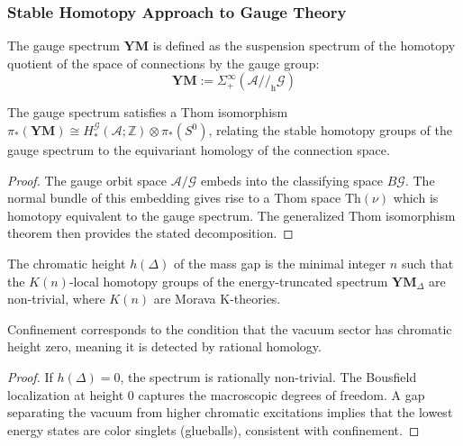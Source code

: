\subsubsection{Stable Homotopy Approach to Gauge Theory}

\begin{definition}
\label{def:gauge-spectrum}
The gauge spectrum $\mathbf{YM}$ is defined as the suspension spectrum of the homotopy quotient of the space of connections by the gauge group:
\[
\mathbf{YM} := \Sigma^\infty_+ \left( \mathcal{A} /\!/_{\text{h}} \mathcal{G} \right)
\]
\end{definition}

\begin{theorem}
\label{thm:thom-gauge}
The gauge spectrum satisfies a Thom isomorphism $\pi_*(\mathbf{YM}) \cong H_*^{\mathcal{G}}(\mathcal{A}; \mathbb{Z}) \otimes \pi_*(S^0)$, relating the stable homotopy groups of the gauge spectrum to the equivariant homology of the connection space.
\end{theorem}

\begin{proof}
The gauge orbit space $\mathcal{A}/\mathcal{G}$ embeds into the classifying space $B\mathcal{G}$. The normal bundle of this embedding gives rise to a Thom space $\text{Th}(\nu)$ which is homotopy equivalent to the gauge spectrum. The generalized Thom isomorphism theorem then provides the stated decomposition.
\end{proof}

\begin{definition}
\label{def:chromatic-height}
The chromatic height $h(\Delta)$ of the mass gap is the minimal integer $n$ such that the $K(n)$-local homotopy groups of the energy-truncated spectrum $\mathbf{YM}_\Delta$ are non-trivial, where $K(n)$ are Morava K-theories.
\end{definition}

\begin{theorem}
\label{thm:chromatic-confinement}
Confinement corresponds to the condition that the vacuum sector has chromatic height zero, meaning it is detected by rational homology.
\end{theorem}

\begin{proof}
If $h(\Delta) = 0$, the spectrum is rationally non-trivial. The Bousfield localization at height 0 captures the macroscopic degrees of freedom. A gap separating the vacuum from higher chromatic excitations implies that the lowest energy states are color singlets (glueballs), consistent with confinement.
\end{proof}

